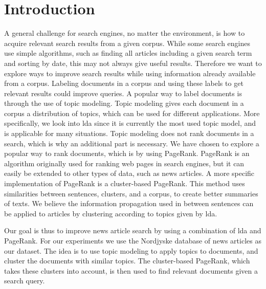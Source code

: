 \section{Introduction} 
A general challenge for search engines, no matter the environment, is how to acquire relevant search results from a given corpus.
While some search engines use simple algorithms, such as finding all articles including a given search term and sorting by date, this may not always give useful results.
Therefore we want to explore ways to improve search results while using information already available from a corpus.
Labeling documents in a corpus and using these labels to get relevant results could improve queries.
A popular way to label documents is through the use of topic modeling. 
Topic modeling gives each document in a corpus a distribution of topics, which can be used for different applications.
More specifically, we look into \gls{lda} since it is currently the most used topic model, and is applicable for many situations\cite{lda}.
Topic modeling does not rank documents in a search, which is why an additional part is necessary.
We have chosen to explore a popular way to rank documents, which is by using PageRank.
PageRank is an algorithm originally used for ranking web pages in search engines, but it can easily be extended to other types of data, such as news articles.
A more specific implementation of PageRank is a cluster-based PageRank\cite{ClusterPageRank}.
This method uses similarities between sentences, clusters, and a corpus, to create better summaries of texts.
We believe the information propagation  used in \cite{ClusterPageRank} between sentences can be applied to articles by clustering according to topics given by \gls{lda}.

Our goal is thus to improve news article search by using a combination of \gls{lda} and PageRank.
For our experiments we use the Nordjyske database of news articles as our dataset.
The idea is to use topic modeling to apply topics to documents, and cluster the documents with similar topics.
The cluster-based PageRank, which takes these clusters into account, is then used to find relevant documents given a search query.




